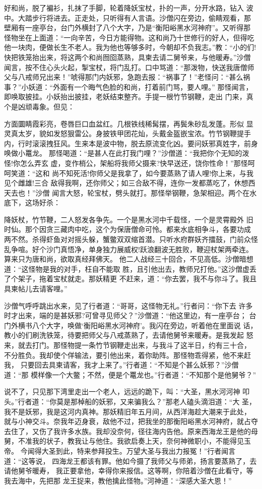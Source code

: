 好和尚，脱了褊衫，扎抹了手脚，轮着降妖宝杖，扑的一声，分开水路，钻入
波中。大踏步行将进去。正走处，只听得有人言语。沙僧闪在旁边，偷睛观看，那
壁厢有一座亭台，台门外横封了八个大字，乃是“衡阳峪黑水河神府”。又听得那
怪物坐在上面道：“一向辛苦，今日方能得物。这和尚乃十世修行的好人，但得吃
他一块肉，便做长生不老人。我为他也等够多时，今朝却不负我志。”教：“小的们!
快把铁笼抬出来，将这两个和尚囫囵蒸熟，具柬去请二舅爷来，与他暖寿。”沙僧
闻言，按不住心头火起，掣宝杖，将门乱打。口中骂道：“那泼物，快送我唐僧师
父与八戒师兄出来！”唬得那门内妖邪，急跑去报：“祸事了！”老怪问：“甚么祸
事？”小妖道：“外面有一个晦气色脸的和尚，打着前门骂，要人哩。”
那怪闻言，即唤取披挂。小妖抬出披挂，老妖结束整齐。手提一根竹节钢鞭，走出
门来，真个是凶顽毒象。但见：

方面圜睛霞彩亮，卷唇巨口血盆红。几根铁线稀髯摆，再鬓朱砂乱发蓬。形似
显灵真太岁，貌如发怒狠雷公。身披铁甲团花灿，头戴金盔嵌宝浓。竹节钢鞭提手
内，行时滚滚拽狂风。生来本是波中物，脱去原流变化凶。要问妖邪真姓字，前身
唤做小鼍龙。
那怪喝道：“是甚人在此打我门哩？”沙僧道：“我把你个无知的泼怪!你怎么弄玄
虚，变作梢公，架船将我师父摄来?快早送还，饶你性命！”那怪呵呵笑道：“这和
尚不知死活!你师父是我拿了，如今要蒸熟了请人哩!你上来，与我见个雌雄!三合
敌得我啊，还你师父；如三合敌不得，连你一发都蒸吃了，休想西天去也！”沙僧
闻言大怒，轮宝杖，劈头就打。那怪举钢鞭，急架相迎。两个在水底下，这场好杀：

降妖杖，竹节鞭，二人怒发各争先。一个是黑水河中千载怪，一个是灵霄殿外
旧时仙。那个因贪三藏肉中吃，这个为保唐僧命可怜。都来水底相争斗，各要功成
两不然。杀得虾鱼对对摇头躲，蟹鳖双双缩首潜。只听水府群妖齐擂鼓，门前众怪
乱争喧。好个沙门真悟净，单身独力展威权!跃浪翻波无胜败，鞭迎杖架两牵连。
算来只为唐和尚，欲取真经拜佛天。
他二人战经三十回合，不见高低。沙僧暗想道：“这怪物是我的对手，枉自不能取
胜，且引他出去，教师兄打他。”这沙僧虚丢了个架子，拖着宝杖就走。那妖精更
不赶来，道：“你去罢，我不与你斗了。我且具柬帖儿去请客哩。”

沙僧气呼呼跳出水来，见了行者道：“哥哥，这怪物无礼。”行者问：“你下去
许多时才出来，端的是甚妖邪?可曾寻见师父？”沙僧道：“他这里边，有一座亭台；
台门外横书八个大字，唤做‘衡阳峪黑水河神府’。我闪在旁边，听着他在里面说
话，教小的们刷洗铁笼，待要把师父与八戒蒸熟了，去请他舅爷来暖寿。是我发起
怒来，就去打门。那怪物提一条竹节钢鞭走出来，与我斗了这半日，约有三十合，
不分胜负。我却使个佯输法，要引他出来，着你助阵。那怪物乖得紧，他不来赶我，
只要回去具柬请客，我才上来了。”行者道：“不知是个甚么妖邪？”沙僧道：“那
模样像一个大鳖；不然，便是个鼍龙也。”行者道：“不知那个是他舅爷？”

说不了，只见那下湾里走出一个老人，远远的跪下，叫：“大圣，黑水河河神
叩头。”行者道：“你莫是那棹船的妖邪，又来骗我么？”那老人磕头滴泪道：“大
圣，我不是妖邪，我是这河内真神。那妖精旧年五月间，从西洋海趁大潮来于此处，
就与小神交斗。奈我年迈身衰，敌他不过，把我坐的那衡阳峪黑水河神府，就占夺
去住了，又伤了我许多水族。我却没奈何，径往海内告他。原来西海龙王是他的母
舅，不准我的状子，教我让与他住。我欲启奏上天，奈何神微职小，不能得见玉帝。
今闻得大圣到此，特来参拜投生。万望大圣与我出力报冤！”行者闻言道：“这等说，
四海龙王都该有罪。他如今摄了我师父与师弟，扬言要蒸熟了，去请他舅爷暖寿，
我正要拿他，幸得你来报信。这等啊，你陪着沙僧在此看守，等我去海中，先把那
龙王捉来，教他擒此怪物。”河神道：“深感大圣大恩！”

